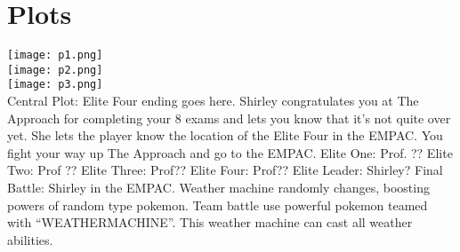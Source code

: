 \documentclass[11pt,fleqn]{book} %
\begin{document}
\section{Plots}
\texttt{[image: p1.png]}\\
\texttt{[image: p2.png]}\\
\texttt{[image: p3.png]}\\
Central Plot:
Elite Four ending goes here. Shirley congratulates you at The Approach for completing your 8 exams and lets you know that it’s not quite over yet. She lets the player know the location of the Elite Four in the EMPAC. You fight your way up The Approach and go to the EMPAC.
Elite One: Prof. ??
Elite Two: Prof ??
Elite Three: Prof??
Elite Four: Prof?? 
Elite Leader: Shirley?
Final Battle:
Shirley in the EMPAC.
Weather machine randomly changes, boosting powers of random type pokemon.
Team battle use powerful pokemon teamed with “WEATHERMACHINE”. This weather machine can cast all weather abilities.
\end{document}
